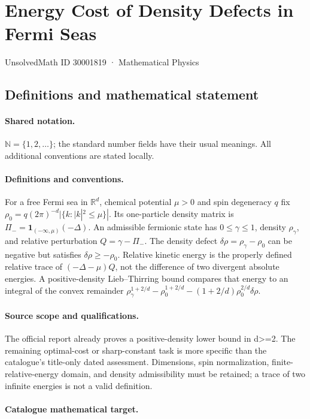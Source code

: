 \documentclass[11pt]{article}
\begin{document}
\setcounter{section}{30001818}
\section{Energy Cost of Density Defects in Fermi Seas}\label{30001819}
{\small UnsolvedMath ID 30001819 · Mathematical Physics}
\subsection{Definitions and mathematical statement}

\paragraph{Shared notation.}$\mathbb N=\{1,2,\ldots\}$; the standard number fields have their usual meanings. All additional conventions are stated locally.


\paragraph{Definitions and conventions.} For a free Fermi sea in $\mathbb R^d$, chemical potential $\mu>0$ and spin degeneracy $q$ fix $\rho_0=q(2\pi)^{-d}|\{k:|k|^2\le\mu\}|$. Its one-particle density matrix is $\Pi_-=\mathbf1_{(-\infty,\mu)}(-\Delta)$. An admissible fermionic state has $0\le\gamma\le1$, density $\rho_\gamma$, and relative perturbation $Q=\gamma-\Pi_-$. The density defect $\delta\rho=\rho_\gamma-\rho_0$ can be negative but satisfies $\delta\rho\ge-\rho_0$. Relative kinetic energy is the properly defined relative trace of $(-\Delta-\mu)Q$, not the difference of two divergent absolute energies. A positive-density Lieb--Thirring bound compares that energy to an integral of the convex remainder $\rho_\gamma^{1+2/d}-\rho_0^{1+2/d}-(1+2/d)\rho_0^{2/d}\delta\rho$.

\paragraph{Source scope and qualifications.} The official report already proves a positive-density lower bound in d>=2. The remaining optimal-cost or sharp-constant task is more specific than the catalogue's title-only dated assessment. Dimensions, spin normalization, finite-relative-energy domain, and density admissibility must be retained; a trace of two infinite energies is not a valid definition.

\paragraph{Catalogue mathematical target.}
\end{document}
